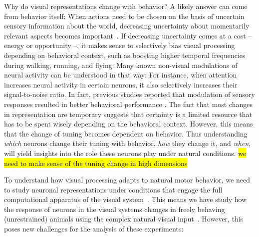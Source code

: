 \documentclass[B2,COG]{ercgrant}
\begin{document}
Why do visual representations change with behavior? 
A likely answer can come from behavior itself:
When actions need to be chosen on the basis of uncertain sensory information about the world, decreasing uncertainty about momentarily relevant aspects becomes important~\parencite{Chebolu2022-tb}. 
If decreasing uncertainty comes at a cost -- energy or opportunity --, it makes sense to selectively bias visual processing depending on behavioral context, such as boosting higher temporal frequencies during walking, running, and flying.
Many known non-visual modulations of neural activity can be understood in that way: 
For instance, when attention increases neural activity in certain neurons, it also selectively increases their signal-to-noise ratio. 
In fact, previous studies reported that modulation of sensory responses resulted in better behavioral performance \parencite{Spitzer1988-kq, Bennett2013-rk, Dadarlat2017-jw, De_Gee2022-ir}.
The fact that most changes in representation are temporary suggests that certainty is a limited resource that has to be spent wisely depending on the behavioral context.
However, this means that the change of tuning becomes dependent on behavior.
Thus understanding \textit{which} neurons change their tuning with behavior, \textit{how} they change it, and  \textit{when},  will yield insights into the role these neurons play under natural conditions. \hl{we need to make sense of the tuning change in high dimensions}

To understand how visual processing adapts to natural motor behavior, we need to study neuronal representations under conditions that engage the full computational apparatus of the visual system~\parencite{Huk2018-ez, Datta2019-qj}. 
This means we have study how the response of neurons in the visual systems changes in freely behaving (unrestrained) animals using the complex natural visual input~\parencite[\eg][]{Parker2022-ac}.
However, this poses new challenges for the analysis of these experiments:
    
\end{document}
